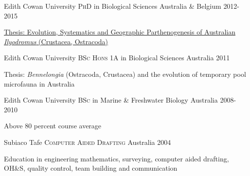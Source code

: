 

\begin{cventries}

  \cventry
    {Edith Cowan University} %
    {\textsc{PhD} in Biological Sciences} %
    {Australia \& Belgium} %
    {2012-2015} %
    {
      \begin{cvitems} %
        \item {\href{http://ro.ecu.edu.au/theses_ebooks/1/}{Thesis: Evolution, Systematics and Geographic Parthenogenesis of Australian \textit{Ilyodromus} (Crustacea, Ostracoda)}}
      \end{cvitems}
    }

  \cventry
    {Edith Cowan University} %
    {\textsc{BSc Hons 1A} in Biological Sciences} %
    {Australia} %
    {2011} %
    {
   	  \begin{cvitems} %
  		 \item {Thesis: \textit{Bennelongia} (Ostracoda, Crustacea) and the evolution of temporary pool microfauna in Australia}
   	  \end{cvitems}
    }
  
  \cventry
  {Edith Cowan University} %
  {\textsc{BSc} in Marine \& Freshwater Biology} %
  {Australia} %
  {2008-2010} %
  {
  	\begin{cvitems} %
  		\item {Above 80 percent course average}
  	\end{cvitems}
  }
  
  \cventry
  {Subiaco Tafe} %
  {\textsc{Computer Aided Drafting}} %
  {Australia} %
  {2004} %
  {
  	\begin{cvitems} %
  		\item {Education in engineering mathematics, surveying, computer aided drafting, OH\&S, quality control, team building and communication}
  	\end{cvitems}
  }
  
\end{cventries}

